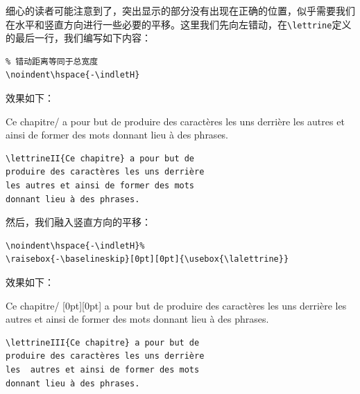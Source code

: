 细心的读者可能注意到了，突出显示的部分没有出现在正确的位置，似乎需要我们在水平和竖直方向进行一些必要的平移。这里我们先向左错动，在\verb|\lettrine|定义的最后一行，我们编写如下内容：

\begin{dmd}
\begin{verbatim}
% 错动距离等同于总宽度
\noindent\hspace{-\indletH}\end{verbatim}
\end{dmd}

效果如下：

\newcommand{\lettrineII}[1]{%
  \creerlettrine#1/%
  \setlength{\larligH}{\textwidth-\indletH}%
  \setlength{\larligB}{\textwidth-\indletB}%
  \parshape=3%
  \indletH\larligH%
  \indletB\larligB%
  0cm\textwidth%
  \setlength{\fboxrule}{.5pt}\setlength{\fboxsep}{-.5pt}%
  \noindent\hspace{-\indletH}\fbox{\usebox{\lalettrine}}}

\begin{codelist}[11.26]{
\lettrineII{Ce chapitre} a pour but de
produire des caractères les uns derrière
les autres et ainsi de former des mots
donnant lieu à des phrases.
}
\begin{verbatim}
\lettrineII{Ce chapitre} a pour but de
produire des caractères les uns derrière
les autres et ainsi de former des mots
donnant lieu à des phrases.\end{verbatim}
\end{codelist}

然后，我们融入竖直方向的平移：

\begin{dmd}
\begin{verbatim}
\noindent\hspace{-\indletH}% 
\raisebox{-\baselineskip}[0pt][0pt]{\usebox{\lalettrine}}\end{verbatim}
\end{dmd}

效果如下：

\newcommand{\lettrineIII}[1]{%
  \creerlettrine#1/%
  \setlength{\larligH}{\textwidth-\indletH}%
  \setlength{\larligB}{\textwidth-\indletB}%
  \parshape=3%
  \indletH\larligH%
  \indletB\larligB%
  0cm\textwidth%
  \setlength{\fboxrule}{.5pt}\setlength{\fboxsep}{-.5pt}%
  \noindent\hspace{-\indletH}%
  \raisebox{-\baselineskip}[0pt][0pt]{%
    \fbox{\usebox{\lalettrine}}}}

\begin{codelist}[11.27]{
\lettrineIII{Ce chapitre} a pour but de
produire des caractères les uns derrière
les  autres et ainsi de former des mots
donnant lieu à des phrases.
}
\begin{verbatim}
\lettrineIII{Ce chapitre} a pour but de
produire des caractères les uns derrière
les  autres et ainsi de former des mots
donnant lieu à des phrases.\end{verbatim}
\end{codelist}


